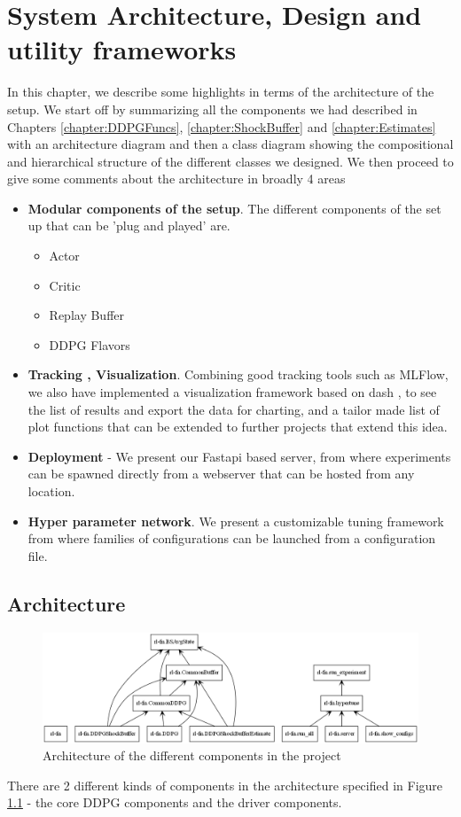
\chapter{System Architecture, Design and utility frameworks}\label{chapter:SystemArchitecture}
In this chapter, we describe some highlights in terms of the architecture of the setup.  We start off by summarizing all the components we had described in Chapters \ref{chapter:DDPGFuncs}, \ref{chapter:ShockBuffer} and \ref{chapter:Estimates} with an architecture diagram and then a class diagram showing the compositional and hierarchical structure of the different classes we designed. We then proceed to give some comments about the architecture in broadly 4 areas
\begin{itemize}
    \item \textbf{Modular components of the setup}. The different components of the set up that can be 'plug and played' are.
    \begin{itemize}
        \item Actor 
        \item Critic 
        \item Replay Buffer
        \item DDPG Flavors
    \end{itemize}
    \item \textbf{Tracking , Visualization}. Combining good tracking tools such as MLFlow, we also have implemented a visualization framework based on dash \cite{dash_2022}, to see the list of results and export the data for charting, and a tailor made list of plot functions that can be extended to further projects that extend this idea.  
    \item \textbf{Deployment} - We present our Fastapi\cite{FastAPI} based server, from where experiments can be spawned directly from a webserver that can be hosted from any location.
    
    \item \textbf{Hyper parameter network}. We present a customizable tuning framework from where families of configurations can be launched from a configuration file.
    
\end{itemize}
\section{Architecture}
\begin{figure}[htpb]
\centering
  \includegraphics[width=1.0\textwidth]{figures/Results/rl-fn_architcture.png}
  \caption[Architecture]{Architecture of the different components in the project } \label{fig:architecture}
\end{figure}
There are 2 different kinds of components in the architecture specified in Figure \ref{fig:architecture} - the core DDPG components and the driver components.


